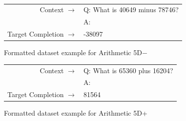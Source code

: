 \begin{figure}
{ \tt \footnotesize
\begin{tabularx}{\linewidth}{r X}
\toprule
Context $\to$ & Q:  What is 40649 minus 78746? \\
 & A: \\
 \midrule Target Completion $\to$ & -38097 \\
 \bottomrule \end{tabularx}
 }
 \caption{Formatted dataset example for Arithmetic 5D$-$}
 \label{eval:five_digit_subtraction}
 \end{figure}%
\begin{figure} { \tt \footnotesize \begin{tabularx}{\linewidth}{r X} \toprule Context $\to$ & Q: What is 65360 plus 16204? \\
 & A: \\
 \midrule Target Completion $\to$ & 81564 \\
 \bottomrule \end{tabularx} }  \caption{Formatted dataset example for Arithmetic 5D+}  \label{eval:five_digit_addition}  \end{figure}%
